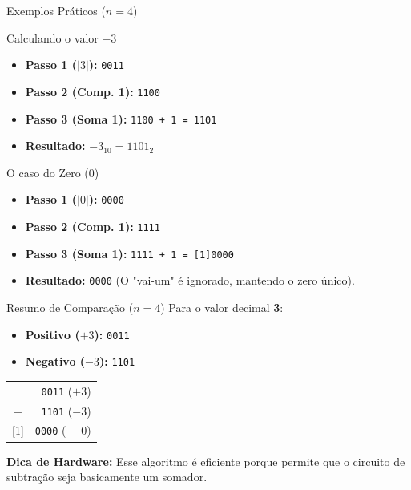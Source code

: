 \begin{frame}{Exemplos Práticos ($n=4$)}
    \begin{exampleblock}{Calculando o valor $-3$}
        \begin{itemize}
            \item \textbf{Passo 1 ($|3|$):} \texttt{0011}
            \item \textbf{Passo 2 (Comp. 1):} \texttt{1100}
            \item \textbf{Passo 3 (Soma 1):} \texttt{1100 + 1 = 1101}
            \item \textbf{Resultado:} $-3_{10} = 1101_2$
        \end{itemize}
    \end{exampleblock}

    \begin{exampleblock}{O caso do Zero ($0$)}
        \begin{itemize}
            \item \textbf{Passo 1 ($|0|$):} \texttt{0000}
            \item \textbf{Passo 2 (Comp. 1):} \texttt{1111}
            \item \textbf{Passo 3 (Soma 1):} \texttt{1111 + 1 = [1]0000}
            \item \textbf{Resultado:} \texttt{0000} (O "vai-um" é ignorado, mantendo o zero único).
        \end{itemize}
    \end{exampleblock}
\end{frame}

\begin{frame}{Resumo de Comparação ($n=4$)}
    Para o valor decimal \textbf{3}:

    \vspace{0.3cm}
    \begin{itemize}
        \item \textbf{Positivo ($+3$):} \texttt{0011}
        \item \textbf{Negativo ($-3$):} \texttt{1101}
    \end{itemize}

    \begin{center}
        \begin{tabular}{cr}
                        & \texttt{0011} ($+3$)            \\
            $+$         & \texttt{1101} ($-3$)            \\ \hline
            \small{[1]} & \texttt{0000} ($\phantom{[]}0$)
        \end{tabular}
    \end{center}

    \vspace{0.3cm}
    \textbf{Dica de Hardware:} Esse algoritmo é eficiente porque permite que o circuito de subtração seja basicamente um somador.
\end{frame}

